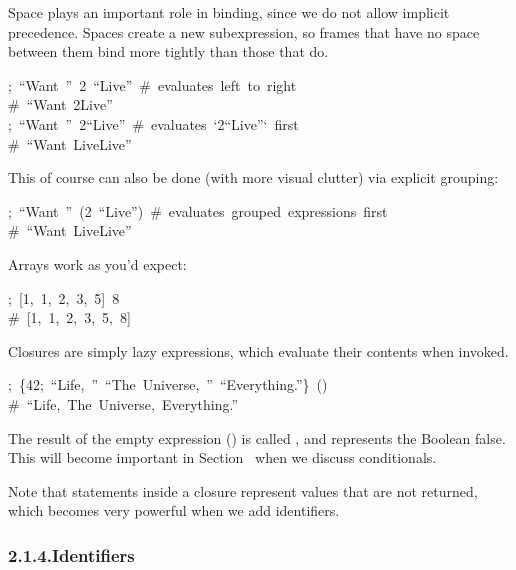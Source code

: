 \documentclass[preprint]{{acmart}}
\begin{document}
Space plays an important role in binding, since we do not allow implicit
precedence. Spaces create a new subexpression, so frames that have no
space between them bind more tightly than those that do.%
\begin{mdpre}%
\noindent;~“{Want}~”~2~“{Live}”~{\#~evaluates~left~to~right}\\
{\#~“Want~2Live”}\\
;~“{Want}~”~2“{Live}”~{\#~evaluates~`2“Live”`~first}\\
{\#~“Want~LiveLive”}%
\end{mdpre}\noindent{}This of course can also be done (with more visual clutter) via explicit grouping:
\begin{mdpre}%
\noindent;~“{Want}~”~(2~“{Live}”)~{\#~evaluates~grouped~expressions~first}\\
{\#~“Want~LiveLive”}%
\end{mdpre}\noindent{}Arrays work as you'd expect:
\begin{mdpre}%
\noindent;~{}[1,~1,~2,~3,~5]~8\\
{\#~{}[1,~1,~2,~3,~5,~8]}%
\end{mdpre}\noindent{}Closures are simply lazy expressions, which evaluate their contents when invoked.
\begin{mdpre}%
\noindent;~\{{42};~“{Life},~”~“{The}~{Universe},~”~“{Everything}.”\}~()\\
{\#~“Life,~The~Universe,~Everything.”}%
\end{mdpre}\noindent{}The result of the empty expression (\mdcode{()}) is called , and represents the Boolean false.
This will become important in Section~ when we discuss conditionals.

Note that statements inside a closure represent values that are not
returned, which becomes very powerful when we add identifiers.%

\subsubsection{2.1.4.\hspace*{0.5em}Identifiers}\label{sec-identifiers}%
\end{document}
